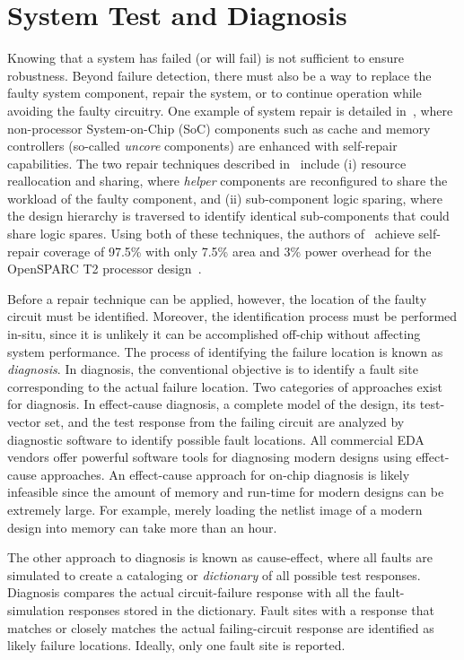 \section{System Test and Diagnosis}
\label{sec:intro_system_test_and_diag}

Knowing that a system has failed (or will fail) is not sufficient to ensure robustness.
%
Beyond failure detection, there must also be a way to replace the faulty system component, repair the system, or to continue operation while avoiding the faulty circuitry.
%
One example of system repair is detailed in~\cite{li13}, where non-processor System-on-Chip (SoC) components such as cache and memory controllers (so-called \textit{uncore} components) are enhanced with self-repair capabilities.
%
The two repair techniques described in~\cite{li13} include (i) resource reallocation and sharing, where \textit{helper} components are reconfigured to share the workload of the faulty component, and (ii) sub-component logic sparing, where the design hierarchy is traversed to identify identical sub-components that could share logic spares.
%
Using both of these techniques, the authors of~\cite{li13} achieve self-repair coverage of 97.5\% with only 7.5\% area and 3\% power overhead for the OpenSPARC T2 processor design~\cite{sun11}.

Before a repair technique can be applied, however, the location of the faulty circuit must be identified.
%
Moreover, the identification process must be performed in-situ, since it is unlikely it can be accomplished off-chip without affecting system performance.
%
The process of identifying the failure location is known as \textit{diagnosis}.
%
In diagnosis, the conventional objective is to identify a fault site corresponding to the actual failure location.
%
Two categories of approaches exist for diagnosis.
%
In effect-cause diagnosis, a complete model of the design, its test-vector set, and the test response from the failing circuit are analyzed by diagnostic software to identify possible fault locations.
%
All commercial EDA vendors offer powerful software tools for diagnosing modern designs using effect-cause approaches.
%
An effect-cause approach for on-chip diagnosis is likely infeasible since the amount of memory and run-time for modern designs can be extremely large.
%
For example, merely loading the netlist image of a modern design into memory can take more than an hour.

The other approach to diagnosis is known as cause-effect, where all faults are simulated to create a cataloging or \textit{dictionary} of all possible test responses.
%
Diagnosis compares the actual circuit-failure response with all the fault-simulation responses stored in the dictionary.
%
Fault sites with a response that matches or closely matches the actual failing-circuit response are identified as likely failure locations.
%
Ideally, only one fault site is reported.

